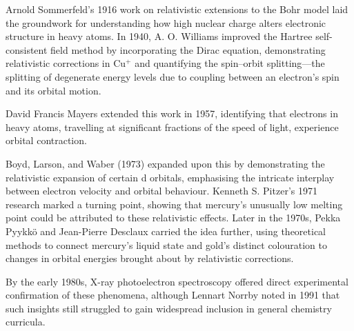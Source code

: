 \begin{historical}
Arnold Sommerfeld’s 1916 work on relativistic extensions to the Bohr model laid the groundwork for understanding how high nuclear charge alters electronic structure in heavy atoms. In 1940, A. O. Williams improved the Hartree self-consistent field method by incorporating the Dirac equation, demonstrating relativistic corrections in Cu$^+$ and quantifying the spin–orbit splitting—the splitting of degenerate energy levels due to coupling between an electron’s spin and its orbital motion.

David Francis Mayers extended this work in 1957, identifying that electrons in heavy atoms, travelling at significant fractions of the speed of light, experience orbital contraction.

Boyd, Larson, and Waber (1973) expanded upon this by demonstrating the relativistic expansion of certain d orbitals, emphasising the intricate interplay between electron velocity and orbital behaviour. Kenneth S. Pitzer’s 1971 research marked a turning point, showing that mercury’s unusually low melting point could be attributed to these relativistic effects. Later in the 1970s, Pekka Pyykkö and Jean-Pierre Desclaux carried the idea further, using theoretical methods to connect mercury’s liquid state and gold’s distinct colouration to changes in orbital energies brought about by relativistic corrections.

By the early 1980s, X-ray photoelectron spectroscopy offered direct experimental confirmation of these phenomena, although Lennart Norrby noted in 1991 that such insights still struggled to gain widespread inclusion in general chemistry curricula.
\end{historical}
